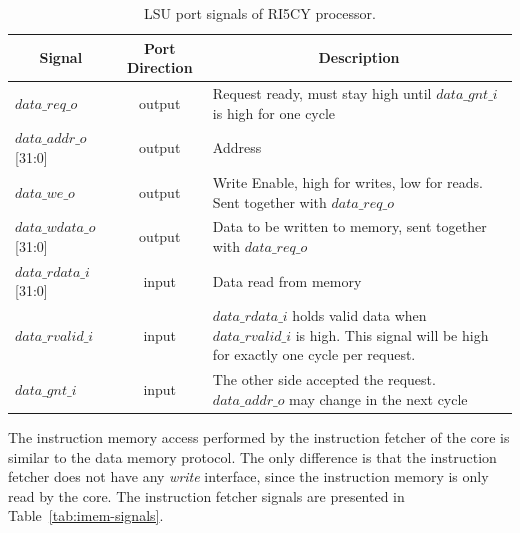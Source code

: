 \begin{table}[htb!] 
	\centering 
	\caption{LSU port signals of RI5CY processor\cite{manual-ri5cy}.} 
	\label{tab:lsu-signals}
	\begin{tabular}{l|c|p{7cm}} 
		\multicolumn{1}{c}{\bfseries Signal} & \multicolumn{1}{c}{\bfseries Port Direction} & \multicolumn{1}{c}{\bfseries Description} \\     
		\hline	
		$data\_req\_o$  &  output & Request ready, must stay high until $data\_gnt\_i$ is        high for one cycle \\
		\hline
		$data\_addr\_o$[31:0]  &  output & Address \\
		\hline
		$data\_we\_o$  &  output & Write Enable, high for writes, low for reads. Sent            together with $data\_req\_o$ \\
		\hline
		$data\_wdata\_o$[31:0]  &  output & Data to be written to memory, sent together with     $data\_req\_o$ \\
		\hline
		$data\_rdata\_i$[31:0]  &  input & Data read from memory \\
		\hline
		$data\_rvalid\_i$  &  input & $data\_rdata\_i$ holds valid data when                     $data\_rvalid\_i$ is high. This signal will be high for exactly one cycle per        request. \\
		\hline
		$data\_gnt\_i$  &  input & The other side accepted the request. $data\_addr\_o$ may     change in the next cycle \\
		\hline
	\end{tabular} 
\end{table}

The instruction memory access performed by the instruction fetcher of the core is similar to the data memory protocol. The only difference is that the instruction fetcher does not have any \textit{write} interface, since the instruction memory is only read by the core. The instruction fetcher signals are presented in Table~\ref{tab:imem-signals}.

